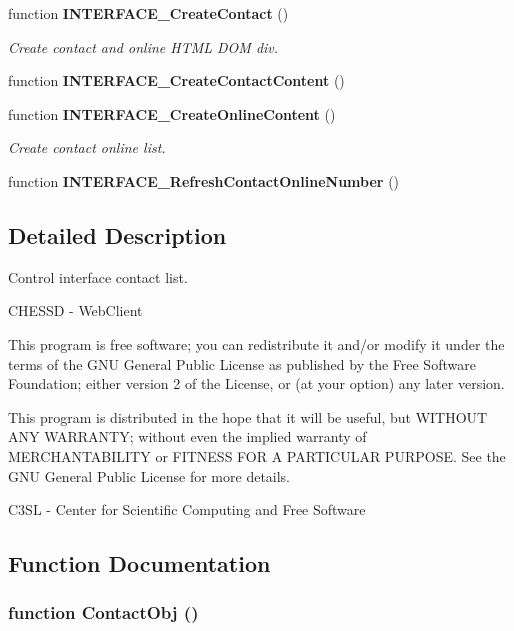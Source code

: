 \begin{CompactItemize}
function {\bf INTERFACE\_\-CreateContact} ()
\begin{CompactList}\small\item\em Create contact and online HTML DOM div. \item\end{CompactList}\item 
function {\bf INTERFACE\_\-CreateContactContent} ()
\item 
function {\bf INTERFACE\_\-CreateOnlineContent} ()
\begin{CompactList}\small\item\em Create contact online list. \item\end{CompactList}\item 
function {\bf INTERFACE\_\-RefreshContactOnlineNumber} ()
\end{CompactItemize}


\subsection{Detailed Description}
Control interface contact list. 

CHESSD - WebClient

This program is free software; you can redistribute it and/or modify it under the terms of the GNU General Public License as published by the Free Software Foundation; either version 2 of the License, or (at your option) any later version.

This program is distributed in the hope that it will be useful, but WITHOUT ANY WARRANTY; without even the implied warranty of MERCHANTABILITY or FITNESS FOR A PARTICULAR PURPOSE. See the GNU General Public License for more details.

C3SL - Center for Scientific Computing and Free Software 

\subsection{Function Documentation}
\subsubsection[ContactObj]{\setlength{\rightskip}{0pt plus 5cm}function ContactObj ()}\label{interface_2contact_8js_befba56b856674055a8dfddbbbb0e72c}




